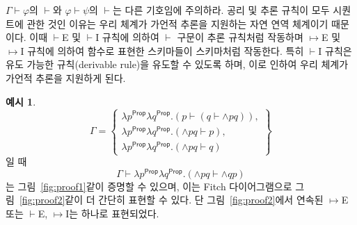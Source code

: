 \documentclass[10pt,twocolumn]{article}
\theoremstyle{definition}
\newtheorem{example}[theorem]{예시}
\newcommand{\Prop}{\mathsf{Prop}}
\begin{document}
$\Gamma\vdash\varphi$의 $\vdash$와 $\varphi\vdash\psi$의 $\vdash$는 다른 기호임에 주의하라. 공리 및 추론 규칙이 모두 시퀀트에 관한 것인 이유는 우리 체계가 가언적 추론을 지원하는 자연 연역 체계이기 때문이다. 이때 $\vdash$E 및 $\vdash$I 규칙에 의하여 $\vdash$ 구문이 추론 규칙처럼 작동하며 $\mapsto$E 및 $\mapsto$I 규칙에 의하여 함수로 표현한 스키마들이 스키마처럼 작동한다. 특히 $\vdash$I 규칙은 유도 가능한 규칙(derivable rule)을 유도할 수 있도록 하며, 이로 인하여 우리 체계가 가언적 추론을 지원하게 된다.

\begin{example} \label{example:proof}
	$$\Gamma = \left\{\begin{array}{l}
		\lambda p^\Prop\lambda q^\Prop.(p\vdash(q\vdash {\land}pq)),\\
		\lambda p^\Prop\lambda q^\Prop.({\land}pq\vdash p),\\
		\lambda p^\Prop\lambda q^\Prop.({\land}pq\vdash q)
	\end{array}\right\}$$
	일 때
	$$\Gamma\vdash \lambda p^\Prop\lambda q^\Prop.({\land}pq\vdash{\land}qp)$$
	는 그림~\ref{fig:proof1}\과 같이 증명할 수 있으며, 이는 Fitch 다이어그램으로 그림~\ref{fig:proof2}\와 같이 더 간단히 표현할 수 있다. 단 그림~\ref{fig:proof2}에서 연속된 $\mapsto$E 또는 $\vdash$E, $\mapsto$I는 하나로 표현되었다.
	

\end{example}
\end{document}
